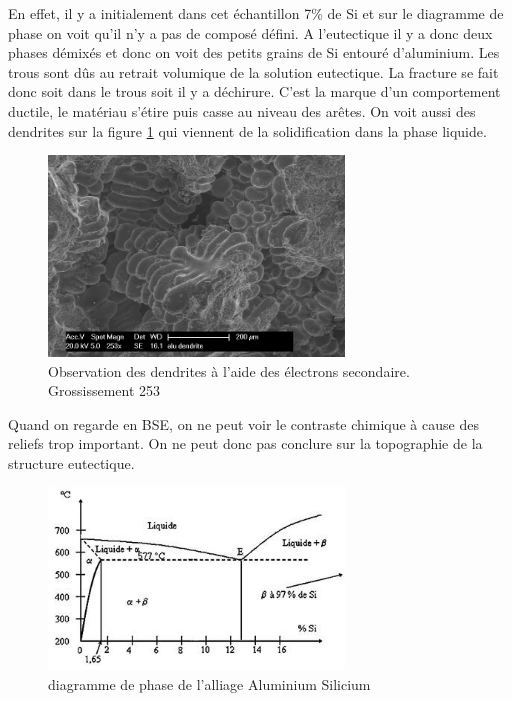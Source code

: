 \documentclass[a4paper,12pt]{article}
\begin{document}
En effet, il y a initialement dans cet échantillon 7\% de Si et sur le diagramme de phase on voit qu'il n'y a pas de composé défini. A l'eutectique il y a donc deux phases démixés et donc on voit des petits grains de Si entouré d'aluminium. Les trous sont dûs au retrait volumique de la solution eutectique. La fracture se fait donc soit dans le trous soit il y a déchirure. C'est la marque d'un comportement ductile, le matériau s'étire puis casse au niveau des arêtes. On voit aussi des dendrites sur la figure \ref{fig:dendrites} qui viennent de la solidification dans la phase liquide.



\begin{figure}
\centering
\includegraphics[width=0.7\textwidth]{images/alu_dendrites.png}
\caption{Observation des dendrites à l'aide des électrons secondaire. Grossissement 253}
\label{fig:dendrites}
\end{figure}

Quand on regarde en BSE, on ne peut voir le contraste chimique à cause des reliefs trop important. On ne peut donc pas conclure sur la topographie de la structure eutectique.
\begin{figure}
\centering
\includegraphics[width=0.7\textwidth]{images/diagphasealusi.jpg}
\caption{diagramme de phase de l'alliage Aluminium Silicium}
\label{fig:diagphase}
\end{figure}
\end{document}
